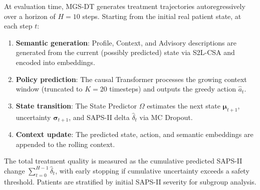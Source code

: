 At evaluation time, MGS-DT generates treatment trajectories autoregressively over a horizon of $H = 10$ steps. Starting from the initial real patient state, at each step $t$:
\begin{enumerate}
    \item \textbf{Semantic generation}: Profile, Context, and Advisory descriptions are generated from the current (possibly predicted) state via S2L-CSA and encoded into embeddings.
    \item \textbf{Policy prediction}: The causal Transformer processes the growing context window (truncated to $K = 20$ timesteps) and outputs the greedy action $\hat{a}_t$.
    \item \textbf{State transition}: The State Predictor $\Omega$ estimates the next state $\boldsymbol{\mu}_{t+1}$, uncertainty $\boldsymbol{\sigma}_{t+1}$, and SAPS-II delta $\hat{\delta}_t$ via MC Dropout.
    \item \textbf{Context update}: The predicted state, action, and semantic embeddings are appended to the rolling context.
\end{enumerate}
The total treatment quality is measured as the cumulative predicted SAPS-II change $\sum_{t=0}^{H-1}\hat{\delta}_t$, with early stopping if cumulative uncertainty exceeds a safety threshold. Patients are stratified by initial SAPS-II severity for subgroup analysis.
